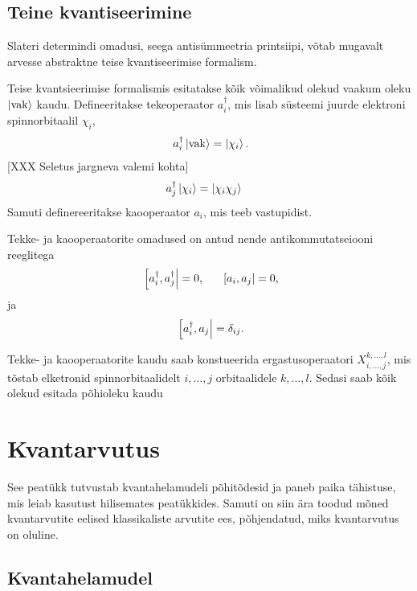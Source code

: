\documentclass[12pt]{report}
\def\ket#1{\mathinner{|#1\rangle}}
\begin{document}
\section{Teine kvantiseerimine}\label{secquant}

Slateri determindi omadusi, seega antisümmeetria printsiipi, võtab mugavalt arvesse abstraktne teise kvantiseerimise formalism.

Teise kvantsieerimise formalismis esitatakse kõik võimalikud olekud vaakum oleku \(\ket{\mathrm{vak}}\) kaudu.
Defineeritakse tekeoperaator \(a_i^{\dagger}\), mis lisab süsteemi juurde elektroni spinnorbitaalil \(\chi_i\),
\begin{align}
    a_i^{\dagger}\ket{\mathrm{vak}} = \ket{\chi_i}\rlap{.}
\end{align}
[XXX Seletus jargneva valemi kohta]
\begin{align}
    a_j^{\dagger}\ket{\chi_i} & =\ket{\chi_i\chi_j}
\end{align}
Samuti definereeritakse kaooperaator \(a_i\), mis teeb vastupidist.

Tekke- ja kaooperaatorite omadused on antud nende antikommutatseiooni reeglitega
\begin{align}
    \left[a_i^{\dagger}, a_j^{\dagger}\right|= 0\rlap{,} \quad\quad
    \left[a_i, a_j\right|= 0\rlap{,}
\end{align}
ja
\begin{equation}
    \left[a_i^{\dagger}, a_j\right| = \delta_{ij}\rlap{.}
\end{equation}

Tekke- ja kaooperaatorite kaudu saab konstueerida ergastusoperaatori \(X_{i,\ldots, j}^{k,\ldots,l}\), mis tõstab elketronid spinnorbitaalidelt \(i,\ldots,j\) orbitaalidele \(k,\ldots, l\).
Sedasi saab kõik olekud esitada põhioleku kaudu~\cite{szabo+ostlnud}



\chapter{Kvantarvutus}

See peatükk tutvustab kvantahelamudeli põhitõdesid ja paneb paika tähistuse,
mis leiab kasutust hilisemates peatükkides. Samuti on siin ära toodud mõned
kvantarvutite eelised klassikaliste arvutite ees, põhjendatud, miks
kvantarvutus on oluline.


\section{Kvantahelamudel}
\end{document}
